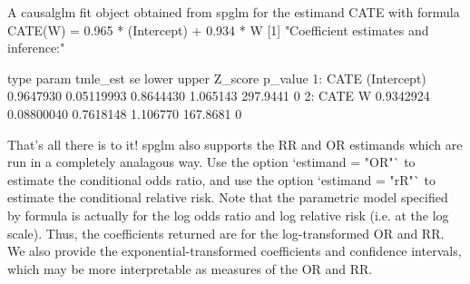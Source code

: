 \documentclass[article]{jss}
\begin{document}
\begin{Schunk}
\begin{Soutput}
A causalglm fit object obtained from spglm for the estimand CATE with formula 
CATE(W) = 0.965 * (Intercept) + 0.934 * W
[1] "Coefficient estimates and inference:"

   type       param  tmle_est         se     lower    upper  Z_score p_value
1: CATE (Intercept) 0.9647930 0.05119993 0.8644430 1.065143 297.9441       0
2: CATE           W 0.9342924 0.08800040 0.7618148 1.106770 167.8681       0
\end{Soutput}
\end{Schunk}



That's all there is to it! spglm also supports the RR and OR estimands which are run in a completely analagous way. Use the option `estimand = "OR"` to estimate the conditional odds ratio, and use the option `estimand = "rR"` to estimate the conditional relative risk. Note that the parametric model specified by formula is actually for the log odds ratio and log relative risk (i.e. at the log scale). Thus, the coefficients returned are for the log-transformed OR and RR. We also provide the exponential-transformed coefficients and confidence intervals, which may be more interpretable as measures of the OR and RR.
\end{document}
